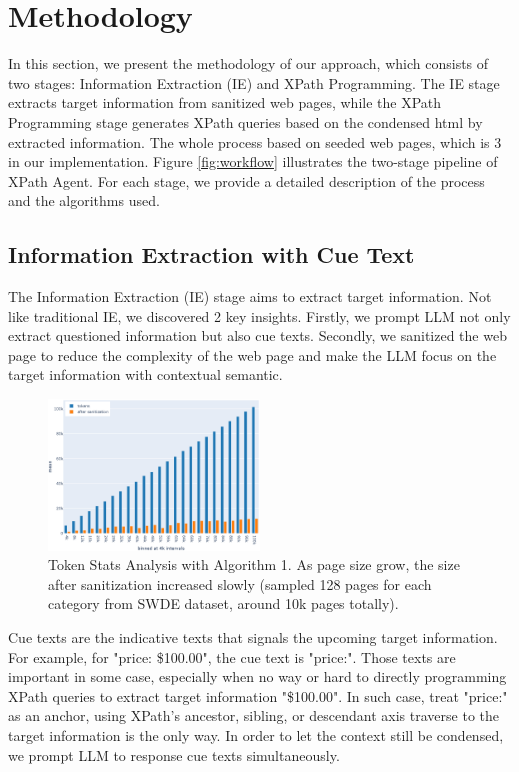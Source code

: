 \documentclass[a4paper]{article}
\begin{document}
\section{Methodology}

In this section, we present the methodology of our approach, which consists of two stages: Information Extraction (IE) and XPath Programming. The IE stage extracts target information from sanitized web pages, while the XPath Programming stage generates XPath queries based on the condensed html by extracted information. The whole process based on seeded web pages, which is 3 in our implementation. Figure \ref{fig:workflow} illustrates the two-stage pipeline of XPath Agent. For each stage, we provide a detailed description of the process and the algorithms used.

\subsection{Information Extraction with Cue Text}

The Information Extraction (IE) stage aims to extract target information. Not like traditional IE, we discovered 2 key insights. Firstly, we prompt LLM not only extract questioned information but also cue texts. Secondly, we sanitized the web page to reduce the complexity of the web page and make the LLM focus on the target information with contextual semantic.

\begin{figure}[h]
  \centering
  \includegraphics[width=0.5\textwidth]{./ie_token_stats.eps}
  \caption{Token Stats Analysis with Algorithm 1. As page size grow, the size after sanitization increased slowly (sampled 128 pages for each category from SWDE dataset, around 10k pages totally).}
  \label{fig:ie_token_stats}
\end{figure}

Cue texts are the indicative texts that signals the upcoming target information. For example, for "price: \$100.00", the cue text is "price:". Those texts are important in some case, especially when no way or hard to directly programming XPath queries to extract target information "\$100.00". In such case, treat "price:" as an anchor, using XPath's ancestor, sibling, or descendant axis traverse to the target information is the only way. In order to let the context still be condensed, we prompt LLM to response cue texts simultaneously.
\end{document}
